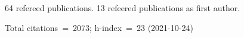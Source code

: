 64 refereed publications. 13 refeered publications as first author.

Total citations~=~2073; h-index~=~23 (2021-10-24)